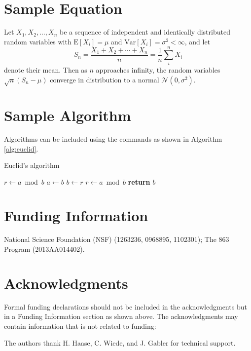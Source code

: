 \documentclass[9pt,twocolumn,twoside]{optica}
\begin{document}
\section{Sample Equation}

Let $X_1, X_2, \ldots, X_n$ be a sequence of independent and identically distributed random variables with $\text{E}[X_i] = \mu$ and $\text{Var}[X_i] = \sigma^2 < \infty$, and let
\begin{equation}
S_n = \frac{X_1 + X_2 + \cdots + X_n}{n}
      = \frac{1}{n}\sum_{i}^{n} X_i
\label{eq:refname1}
\end{equation}
denote their mean. Then as $n$ approaches infinity, the random variables $\sqrt{n}(S_n - \mu)$ converge in distribution to a normal $\mathcal{N}(0, \sigma^2)$.

\section{Sample Algorithm}

Algorithms can be included using the commands as shown in Algorithm \ref{alg:euclid}.

\begin{algorithm}
\caption{Euclid’s algorithm}\label{alg:euclid}
\begin{algorithmic}[1]
\State $r\gets a\bmod b$
\State $a\gets b$
\State $b\gets r$
\State $r\gets a\bmod b$
\EndWhile\label{euclidendwhile}
\State \textbf{return} $b$
\EndProcedure
\end{algorithmic}
\end{algorithm}

\section*{Funding Information}
National Science Foundation (NSF) (1263236, 0968895, 1102301); The 863 Program (2013AA014402).

\section*{Acknowledgments}

Formal funding declarations should not be included in the acknowledgments but in a Funding Information section as shown above. The acknowledgments may contain information that is not related to funding:

The authors thank H. Haase, C. Wiede, and J. Gabler for technical support.
\end{document}
